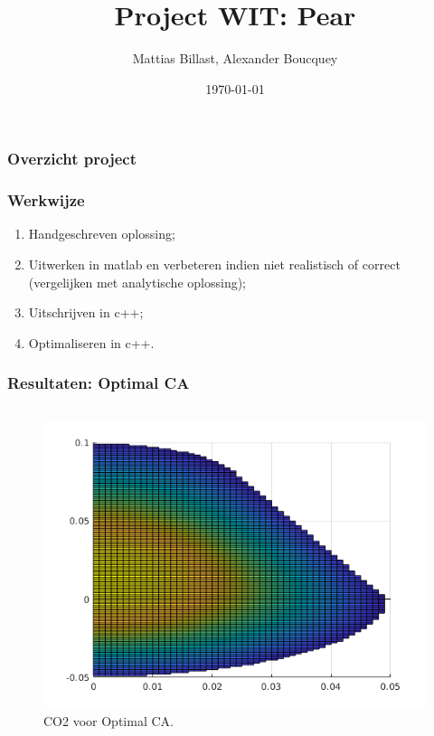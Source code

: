 \documentclass{beamer}
\title{Project WIT: Pear}
\author{Mattias Billast, Alexander Boucquey}
\date{\today}
\begin{document}
\begin{frame}
\frametitle{Overzicht project}
\tableofcontents
\end{frame}

\begin{frame}
\frametitle{Werkwijze}
\begin{enumerate}
\item Handgeschreven oplossing;
\item Uitwerken in matlab en verbeteren indien niet realistisch of correct (vergelijken met analytische oplossing);
\item Uitschrijven in c++;
\item Optimaliseren in c++.
\end{enumerate}
\end{frame}

\begin{frame}
\frametitle{Resultaten: Optimal CA}

\begin{columns}
\begin{column}{0.48\textwidth}
\begin{figure}
\includegraphics[width = 1\textwidth]{Optimal_CA_pear_CO2_boven.png}
\caption{CO2 voor Optimal CA.}
\end{figure}
\end{column}
	

\end{columns}
\end{frame}
\end{document}
